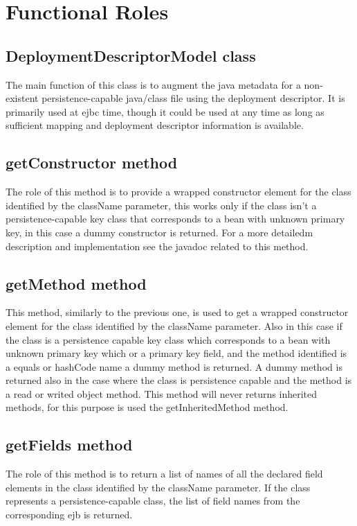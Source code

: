 \section{Functional Roles}
\subsection{DeploymentDescriptorModel class}
The main function of this class is to augment the java metadata for a non-existent persistence-capable java/class file using the deployment descriptor. It is primarily used at ejbc time, though it could be used at any time as long as sufficient mapping and deployment descriptor information is available.

\subsection{getConstructor method}
The role of this method is to provide a wrapped constructor element for the class identified by the className parameter, this works only if the class isn't a persistence-capable key class that corresponds to a bean with unknown primary key, in this case a dummy constructor is returned. For a more detailedm description and implementation see the javadoc related to this method.

\subsection{getMethod method}
This method, similarly to the previous one, is used to get a wrapped constructor element for the class identified by the className parameter. Also in this case if the class is a persistence capable key class which corresponds to a bean with unknown primary key which or a primary key field, and the method identified is a equals or hashCode name a dummy method is returned. A dummy method is returned also in the case where the class is persistence capable and the method is a read or writed object method. This method will never returns inherited methods, for this purpose is used the getInheritedMethod method.

\subsection{getFields method}
The role of this method is to return a list of names of all the declared field elements in the class identified by the className parameter. If the class represents a persistence-capable class, the list of field names from the corresponding ejb is returned.

